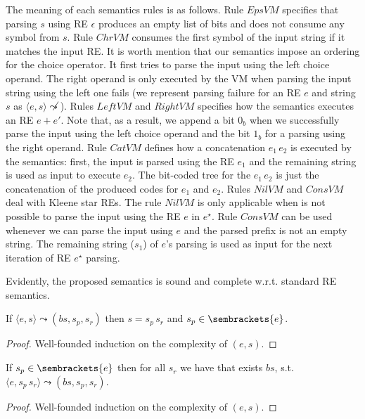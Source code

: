 The meaning of each semantics rules is as follows. Rule $EpsVM$ specifies that parsing $s$ using RE $\epsilon$ produces 
an empty list of bits and does not consume any symbol from $s$. Rule $ChrVM$ consumes the first symbol of the input string
if it matches the input RE. 
It is worth mention that our semantics impose an ordering for the choice operator. It first tries to parse the input 
using the left choice operand. The right operand is only executed by the VM when parsing the input string using the left 
one fails (we represent parsing failure for an RE $e$ and string $s$ as $\langle e, s\rangle\not\leadsto$). Rules $LeftVM$ and 
$RightVM$ specifies how the semantics executes an RE $e + e'$. Note that, as a result, we append a bit $0_b$ when we successfully 
parse the input using the left choice operand and the bit $1_b$ for a parsing using the right operand. Rule $CatVM$ defines 
how a concatenation $e_1\,e_2$ is executed by the semantics: first, the input is parsed using the RE $e_1$ and the remaining 
string is used as input to execute $e_2$. The bit-coded tree for the $e_1\,e_2$ is just the concatenation of the produced 
codes for $e_1$ and $e_2$. Rules $NilVM$ and $ConsVM$ deal with Kleene star REs. The rule $NilVM$ is only applicable when
is not possible to parse the input using the RE $e$ in $e^\star$. Rule $ConsVM$ can be used whenever we can parse the
input using $e$ and the parsed prefix is not an empty string. The remaining string ($s_1$) of $e$'s parsing is used as
input for the next iteration of RE $e^\star$ parsing. 


Evidently, the proposed semantics is sound and complete w.r.t. standard RE semantics.



\begin{Theorem}[Soundness]
  If $\langle e, s \rangle \leadsto (bs,s_p,s_r)$ then $s = s_p\,s_r$ and $s_p\in\sembrackets{e}$.
\end{Theorem}
\begin{proof}
  Well-founded induction on the complexity of $(e,s)$.
\end{proof}

\begin{Theorem}[Completeness]
  If $s_p\in\sembrackets{e}$ then for all $s_r$ we have that exists $bs$, s.t. $\langle e, s_p\,s_r \rangle \leadsto (bs,s_p,s_r)$.
\end{Theorem}
\begin{proof}
  Well-founded induction on the complexity of $(e,s)$.
\end{proof}

